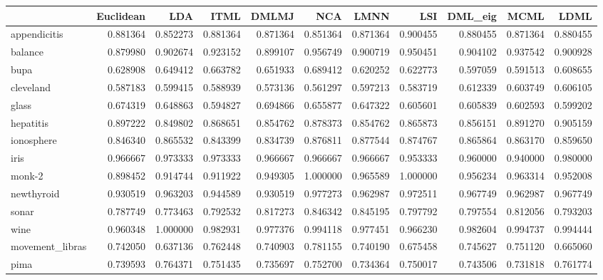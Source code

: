\begin{tabular}{lrrrrrrrrrr}
\toprule
{} &  Euclidean &       LDA &      ITML &     DMLMJ &       NCA &      LMNN &       LSI &   DML\_eig &      MCML &      LDML \\
\midrule
appendicitis    &   0.881364 &  0.852273 &  0.881364 &  0.871364 &  0.851364 &  0.871364 &  0.900455 &  0.880455 &  0.871364 &  0.880455 \\
balance         &   0.879980 &  0.902674 &  0.923152 &  0.899107 &  0.956749 &  0.900719 &  0.950451 &  0.904102 &  0.937542 &  0.900928 \\
bupa            &   0.628908 &  0.649412 &  0.663782 &  0.651933 &  0.689412 &  0.620252 &  0.622773 &  0.597059 &  0.591513 &  0.608655 \\
cleveland       &   0.587183 &  0.599415 &  0.588939 &  0.573136 &  0.561297 &  0.597213 &  0.583719 &  0.612339 &  0.603749 &  0.606105 \\
glass           &   0.674319 &  0.648863 &  0.594827 &  0.694866 &  0.655877 &  0.647322 &  0.605601 &  0.605839 &  0.602593 &  0.599202 \\
hepatitis       &   0.897222 &  0.849802 &  0.868651 &  0.854762 &  0.878373 &  0.854762 &  0.865873 &  0.856151 &  0.891270 &  0.905159 \\
ionosphere      &   0.846340 &  0.865532 &  0.843399 &  0.834739 &  0.876811 &  0.877544 &  0.874767 &  0.865864 &  0.863170 &  0.859650 \\
iris            &   0.966667 &  0.973333 &  0.973333 &  0.966667 &  0.966667 &  0.966667 &  0.953333 &  0.960000 &  0.940000 &  0.980000 \\
monk-2          &   0.898452 &  0.914744 &  0.911922 &  0.949305 &  1.000000 &  0.965589 &  1.000000 &  0.956234 &  0.963314 &  0.952008 \\
newthyroid      &   0.930519 &  0.963203 &  0.944589 &  0.930519 &  0.977273 &  0.962987 &  0.972511 &  0.967749 &  0.962987 &  0.967749 \\
sonar           &   0.787749 &  0.773463 &  0.792532 &  0.817273 &  0.846342 &  0.845195 &  0.797792 &  0.797554 &  0.812056 &  0.793203 \\
wine            &   0.960348 &  1.000000 &  0.982931 &  0.977376 &  0.994118 &  0.977451 &  0.966230 &  0.982604 &  0.994737 &  0.994444 \\
movement\_libras &   0.742050 &  0.637136 &  0.762448 &  0.740903 &  0.781155 &  0.740190 &  0.675458 &  0.745627 &  0.751120 &  0.665060 \\
pima            &   0.739593 &  0.764371 &  0.751435 &  0.735697 &  0.752700 &  0.734364 &  0.750017 &  0.743506 &  0.731818 &  0.761774 \\

\end{tabular}
